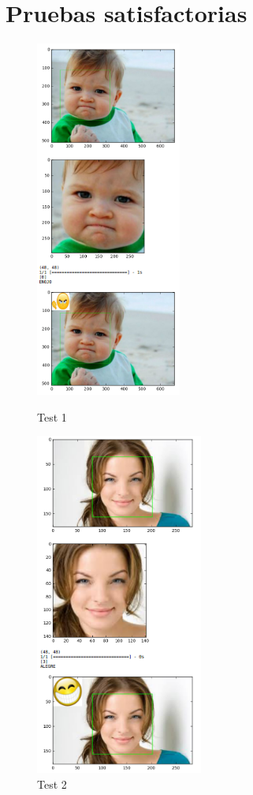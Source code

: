 \section{Pruebas satisfactorias}
\begin{frame}

\begin{figure}[!htbp]
    
    \begin{multicols}{2}
     \includegraphics[angle=0,width=48mm]{Imagenes/test1.png}
       \caption{Test 1}
       \label{fig:test1}   
       
       \includegraphics[angle=0,width=55mm]{Imagenes/test2.png}
           \caption{Test 2}
           \label{fig:test2} 
           
    \end{multicols}
        
\end{figure}
\end{frame}


